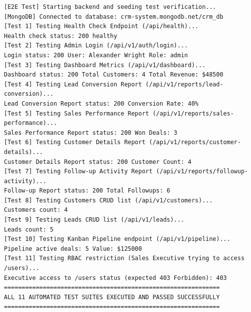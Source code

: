 \begin{lstlisting}[caption={Automated API Verification Execution Output}]
[E2E Test] Starting backend and seeding test verification...
[MongoDB] Connected to database: crm-system.mongodb.net/crm_db
[Test 1] Testing Health Check Endpoint (/api/health)...
Health check status: 200 healthy
[Test 2] Testing Admin Login (/api/v1/auth/login)...
Login status: 200 User: Alexander Wright Role: admin
[Test 3] Testing Dashboard Metrics (/api/v1/dashboard)...
Dashboard status: 200 Total Customers: 4 Total Revenue: $48500
[Test 4] Testing Lead Conversion Report (/api/v1/reports/lead-conversion)...
Lead Conversion Report status: 200 Conversion Rate: 40%
[Test 5] Testing Sales Performance Report (/api/v1/reports/sales-performance)...
Sales Performance Report status: 200 Won Deals: 3
[Test 6] Testing Customer Details Report (/api/v1/reports/customer-details)...
Customer Details Report status: 200 Customer Count: 4
[Test 7] Testing Follow-up Activity Report (/api/v1/reports/followup-activity)...
Follow-up Report status: 200 Total Followups: 6
[Test 8] Testing Customers CRUD list (/api/v1/customers)...
Customers count: 4
[Test 9] Testing Leads CRUD list (/api/v1/leads)...
Leads count: 5
[Test 10] Testing Kanban Pipeline endpoint (/api/v1/pipeline)...
Pipeline active deals: 5 Value: $125000
[Test 11] Testing RBAC restriction (Sales Executive trying to access /users)...
Executive access to /users status (expected 403 Forbidden): 403
=============================================================
ALL 11 AUTOMATED TEST SUITES EXECUTED AND PASSED SUCCESSFULLY
=============================================================
\end{lstlisting}
